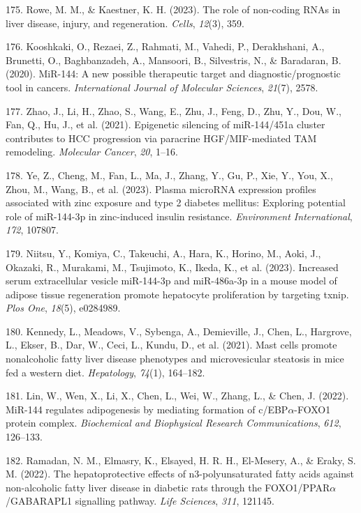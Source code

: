 \documentclass[
  11pt,
  letterpaper,
]{book}
\newlength{\cslhangindent}
\newenvironment{CSLReferences}[2] %
 {\begin{list}{}{%
  \setlength{\itemindent}{0pt}
  \setlength{\leftmargin}{0pt}
  \setlength{\parsep}{0pt}
  \ifodd #1
   \setlength{\leftmargin}{\cslhangindent}
   \setlength{\itemindent}{-1\cslhangindent}
  \fi
  \setlength{\itemsep}{#2\baselineskip}}}
 {\end{list}}
\begin{document}
\begin{CSLReferences}{1}{0}
175. Rowe, M. M., \& Kaestner, K. H. (2023). The role of non-coding RNAs
in liver disease, injury, and regeneration. \emph{Cells}, \emph{12}(3),
359.

176. Kooshkaki, O., Rezaei, Z., Rahmati, M., Vahedi, P., Derakhshani,
A., Brunetti, O., Baghbanzadeh, A., Mansoori, B., Silvestris, N., \&
Baradaran, B. (2020). MiR-144: A new possible therapeutic target and
diagnostic/prognostic tool in cancers. \emph{International Journal of
Molecular Sciences}, \emph{21}(7), 2578.

177. Zhao, J., Li, H., Zhao, S., Wang, E., Zhu, J., Feng, D., Zhu, Y.,
Dou, W., Fan, Q., Hu, J., et al. (2021). Epigenetic silencing of
miR-144/451a cluster contributes to HCC progression via paracrine
HGF/MIF-mediated TAM remodeling. \emph{Molecular Cancer}, \emph{20},
1--16.

178. Ye, Z., Cheng, M., Fan, L., Ma, J., Zhang, Y., Gu, P., Xie, Y.,
You, X., Zhou, M., Wang, B., et al. (2023). Plasma microRNA expression
profiles associated with zinc exposure and type 2 diabetes mellitus:
Exploring potential role of miR-144-3p in zinc-induced insulin
resistance. \emph{Environment International}, \emph{172}, 107807.

179. Niitsu, Y., Komiya, C., Takeuchi, A., Hara, K., Horino, M., Aoki,
J., Okazaki, R., Murakami, M., Tsujimoto, K., Ikeda, K., et al. (2023).
Increased serum extracellular vesicle miR-144-3p and miR-486a-3p in a
mouse model of adipose tissue regeneration promote hepatocyte
proliferation by targeting txnip. \emph{Plos One}, \emph{18}(5),
e0284989.

180. Kennedy, L., Meadows, V., Sybenga, A., Demieville, J., Chen, L.,
Hargrove, L., Ekser, B., Dar, W., Ceci, L., Kundu, D., et al. (2021).
Mast cells promote nonalcoholic fatty liver disease phenotypes and
microvesicular steatosis in mice fed a western diet. \emph{Hepatology},
\emph{74}(1), 164--182.

181. Lin, W., Wen, X., Li, X., Chen, L., Wei, W., Zhang, L., \& Chen, J.
(2022). MiR-144 regulates adipogenesis by mediating formation of
c/EBP\(\alpha\)-FOXO1 protein complex. \emph{Biochemical and Biophysical
Research Communications}, \emph{612}, 126--133.

182. Ramadan, N. M., Elmasry, K., Elsayed, H. R. H., El-Mesery, A., \&
Eraky, S. M. (2022). The hepatoprotective effects of n3-polyunsaturated
fatty acids against non-alcoholic fatty liver disease in diabetic rats
through the FOXO1/PPAR\(\alpha\)/GABARAPL1 signalling pathway.
\emph{Life Sciences}, \emph{311}, 121145.


\end{CSLReferences}
\end{document}
